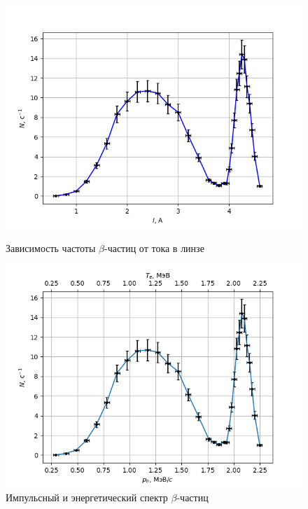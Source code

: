 \documentclass[a4paper,12pt]{article} %
\begin{document}
\begin{figure}[h]
\begin{center}
\begin{minipage}[h]{0.49\linewidth}
\includegraphics[width=1\linewidth]{curr_plot.png}
    \caption{Зависимость частоты $\beta$-частиц от тока в линзе}
    \label{fig:curr_plot}
\end{minipage}
\hfill 
\begin{minipage}[h]{0.49\linewidth}
\includegraphics[width=1\linewidth]{imp_plot.png}
    \caption{Импульсный и энергетический спектр $\beta$-частиц}
    \label{fig:imp_plot}
\end{minipage}
\end{center}
\end{figure}
\end{document}
